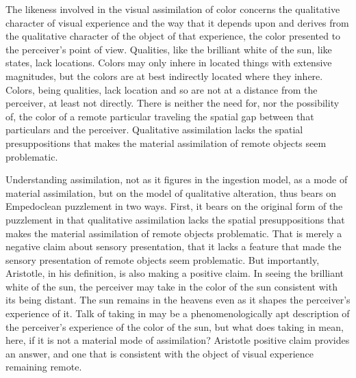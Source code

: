 The likeness involved in the visual assimilation of color concerns the qualitative character of visual experience and the way that it depends upon and derives from the qualitative character of the object of that experience, the color presented to the perceiver's point of view. Qualities, like the brilliant white of the sun, like states, lack locations. Colors may only inhere in located things with extensive magnitudes, but the colors are at best indirectly located where they inhere. Colors, being qualities, lack location and so are not at a distance from the perceiver, at least not directly. There is neither the need for, nor the possibility of, the color of a remote particular traveling the spatial gap between that particulars and the perceiver. Qualitative assimilation lacks the spatial presuppositions that makes the material assimilation of remote objects seem problematic.

Understanding assimilation, not as it figures in the ingestion model, as a mode of material assimilation, but on the model of qualitative alteration, thus bears on Empedoclean puzzlement in two ways. First, it bears on the original form of the puzzlement in that qualitative assimilation lacks the spatial presuppositions that makes the material assimilation of remote objects problematic. That is merely a negative claim about sensory presentation, that it lacks a feature that made the sensory presentation of remote objects seem problematic. But importantly, Aristotle, in his definition, is also making a positive claim. In seeing the brilliant white of the sun, the perceiver may take in the color of the sun consistent with its being distant. The sun remains in the heavens even as it shapes the perceiver's experience of it. Talk of taking in may be a phenomenologically apt description of the perceiver's experience of the color of the sun, but what does taking in mean, here, if it is not a material mode of assimilation? Aristotle positive claim provides an answer, and one that is consistent with the object of visual experience remaining remote. 

